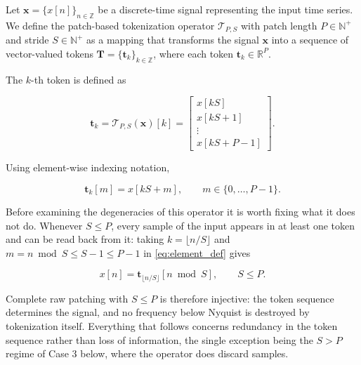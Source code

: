 Let $\mathbf{x} = \{x[n]\}_{n \in \mathbb{Z}}$ be a discrete-time signal representing the input time series. We define the patch-based tokenization operator $\mathcal{T}_{P,S}$ with patch length $P \in \mathbb{N}^{+}$ and stride $S \in \mathbb{N}^{+}$ as a mapping that transforms the signal $\mathbf{x}$ into a sequence of vector-valued tokens $\mathbf{T}=\{\mathbf{t}_k\}_{k\in\mathbb{Z}}$, where each token $\mathbf{t}_k\in\mathbb{R}^{P}$.

The $k$-th token is defined as

\begin{equation}
\label{eq:token_def}
\mathbf{t}_k
=
\mathcal{T}_{P,S}(\mathbf{x})[k]
=
\begin{bmatrix}
x[kS] \\
x[kS+1] \\
\vdots \\
x[kS+P-1]
\end{bmatrix}.
\end{equation}

Using element-wise indexing notation,

\begin{equation}
\label{eq:element_def}
\mathbf{t}_k[m]
=
x[kS+m],
\qquad
m\in\{0,\ldots,P-1\}.
\end{equation}

Before examining the degeneracies of this operator it is worth fixing what it does
not do. Whenever $S\le P$, every sample of the input appears in at least one
token and can be read back from it: taking $k=\lfloor n/S\rfloor$ and
$m = n \bmod S \le S-1 \le P-1$ in \autoref{eq:element_def} gives

\begin{equation}
\label{eq:reconstruction}
x[n]
=
\mathbf{t}_{\lfloor n/S\rfloor}\!\left[n \bmod S\right],
\qquad
S\le P.
\end{equation}

Complete raw patching with $S\le P$ is therefore injective: the token sequence
determines the signal, and no frequency below Nyquist is destroyed by tokenization
itself. Everything that follows concerns redundancy in the token sequence
rather than loss of information, the single exception being the $S>P$ regime of
Case 3 below, where the operator does discard samples.